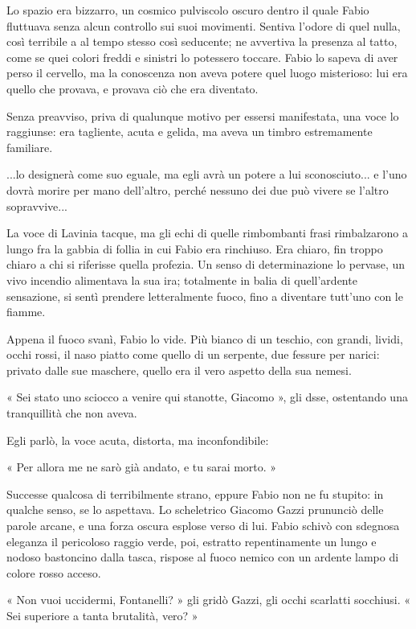 Lo spazio era bizzarro, un cosmico pulviscolo oscuro dentro il quale Fabio fluttuava senza alcun controllo sui suoi movimenti. Sentiva l'odore di quel nulla, così terribile a al tempo stesso così seducente; ne avvertiva la presenza al tatto, come se quei colori freddi e sinistri lo potessero toccare. Fabio lo sapeva di aver perso il cervello, ma la conoscenza non aveva potere quel luogo misterioso: lui era quello che provava, e provava ciò che era diventato.

Senza preavviso, priva di qualunque motivo per essersi manifestata, una voce lo raggiunse: era tagliente, acuta e gelida, ma aveva un timbro estremamente familiare.

...lo designerà come suo eguale, ma egli avrà un potere a lui sconosciuto...
e l'uno dovrà morire per mano dell'altro, perché nessuno dei due può vivere se l'altro sopravvive...

La voce di Lavinia tacque, ma gli echi di quelle rimbombanti frasi rimbalzarono a lungo fra la gabbia di follia in cui Fabio era rinchiuso. Era chiaro, fin troppo chiaro a chi si riferisse quella profezia. Un senso di determinazione lo pervase, un vivo incendio alimentava la sua ira; totalmente in balia di quell'ardente sensazione, si sentì prendere letteralmente fuoco, fino a diventare tutt'uno con le fiamme.

Appena il fuoco svanì, Fabio lo vide. Più bianco di un teschio, con grandi, lividi, occhi rossi, il naso piatto come quello di un serpente, due fessure per narici: privato dalle sue maschere, quello era il vero aspetto della sua nemesi.

« Sei stato uno sciocco a venire qui stanotte, Giacomo », gli dsse, ostentando una tranquillità che non aveva.

Egli parlò, la voce acuta, distorta, ma inconfondibile:

« Per allora me ne sarò già andato, e tu sarai morto. »

Successe qualcosa di terribilmente strano, eppure Fabio non ne fu stupito: in qualche senso, se lo aspettava. Lo scheletrico Giacomo Gazzi prununciò delle parole arcane, e una forza oscura esplose verso di lui. Fabio schivò con sdegnosa eleganza il pericoloso raggio verde, poi, estratto repentinamente un lungo e nodoso bastoncino dalla tasca, rispose al fuoco nemico con un ardente lampo di colore rosso acceso.

« Non vuoi uccidermi, Fontanelli? » gli gridò Gazzi, gli occhi scarlatti socchiusi. « Sei superiore a tanta brutalità, vero? »

